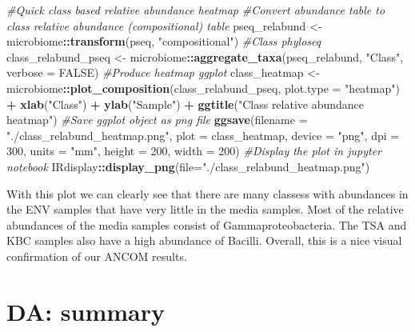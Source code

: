 \documentclass[
]{book}
\newenvironment{Shaded}{\begin{snugshade}}{\end{snugshade}}
\newcommand{\AttributeTok}[1]{\textcolor[rgb]{0.13,0.29,0.53}{#1}}
\newcommand{\CommentTok}[1]{\textcolor[rgb]{0.56,0.35,0.01}{\textit{#1}}}
\newcommand{\ConstantTok}[1]{\textcolor[rgb]{0.56,0.35,0.01}{#1}}
\newcommand{\DecValTok}[1]{\textcolor[rgb]{0.00,0.00,0.81}{#1}}
\newcommand{\FunctionTok}[1]{\textcolor[rgb]{0.13,0.29,0.53}{\textbf{#1}}}
\newcommand{\NormalTok}[1]{#1}
\newcommand{\OtherTok}[1]{\textcolor[rgb]{0.56,0.35,0.01}{#1}}
\newcommand{\SpecialCharTok}[1]{\textcolor[rgb]{0.81,0.36,0.00}{\textbf{#1}}}
\newcommand{\StringTok}[1]{\textcolor[rgb]{0.31,0.60,0.02}{#1}}
\begin{document}
\begin{Shaded}
\begin{Highlighting}[]
\CommentTok{\#Quick class based relative abundance heatmap}
\CommentTok{\#Convert abundance table to class relative abundance (compositional) table}
\NormalTok{pseq\_relabund }\OtherTok{\textless{}{-}}\NormalTok{ microbiome}\SpecialCharTok{::}\FunctionTok{transform}\NormalTok{(pseq, }\StringTok{"compositional"}\NormalTok{)}
\CommentTok{\#Class phyloseq}
\NormalTok{class\_relabund\_pseq }\OtherTok{\textless{}{-}}\NormalTok{ microbiome}\SpecialCharTok{::}\FunctionTok{aggregate\_taxa}\NormalTok{(pseq\_relabund, }\StringTok{"Class"}\NormalTok{, }\AttributeTok{verbose =} \ConstantTok{FALSE}\NormalTok{)}
\CommentTok{\#Produce heatmap ggplot}
\NormalTok{class\_heatmap }\OtherTok{\textless{}{-}}\NormalTok{ microbiome}\SpecialCharTok{::}\FunctionTok{plot\_composition}\NormalTok{(class\_relabund\_pseq, }\AttributeTok{plot.type =} \StringTok{"heatmap"}\NormalTok{) }\SpecialCharTok{+}
  \FunctionTok{xlab}\NormalTok{(}\StringTok{"Class"}\NormalTok{) }\SpecialCharTok{+} \FunctionTok{ylab}\NormalTok{(}\StringTok{"Sample"}\NormalTok{) }\SpecialCharTok{+}
  \FunctionTok{ggtitle}\NormalTok{(}\StringTok{"Class relative abundance heatmap"}\NormalTok{)}
\CommentTok{\#Save ggplot object as png file}
\FunctionTok{ggsave}\NormalTok{(}\AttributeTok{filename =} \StringTok{"./class\_relabund\_heatmap.png"}\NormalTok{, }\AttributeTok{plot =}\NormalTok{ class\_heatmap,}
       \AttributeTok{device =} \StringTok{"png"}\NormalTok{, }\AttributeTok{dpi =} \DecValTok{300}\NormalTok{, }\AttributeTok{units =} \StringTok{"mm"}\NormalTok{, }\AttributeTok{height =} \DecValTok{200}\NormalTok{, }\AttributeTok{width =} \DecValTok{200}\NormalTok{)}
\CommentTok{\#Display the plot in jupyter notebook}
\NormalTok{IRdisplay}\SpecialCharTok{::}\FunctionTok{display\_png}\NormalTok{(}\AttributeTok{file=}\StringTok{"./class\_relabund\_heatmap.png"}\NormalTok{)}
\end{Highlighting}
\end{Shaded}

With this plot we can clearly see that there are many classess with abundances in the ENV samples that have very little in the media samples.
Most of the relative abundances of the media samples consist of Gammaproteobacteria.
The TSA and KBC samples also have a high abundance of Bacilli.
Overall, this is a nice visual confirmation of our ANCOM results.

\hypertarget{da-summary}{%
\section{DA: summary}\label{da-summary}}
\end{document}

